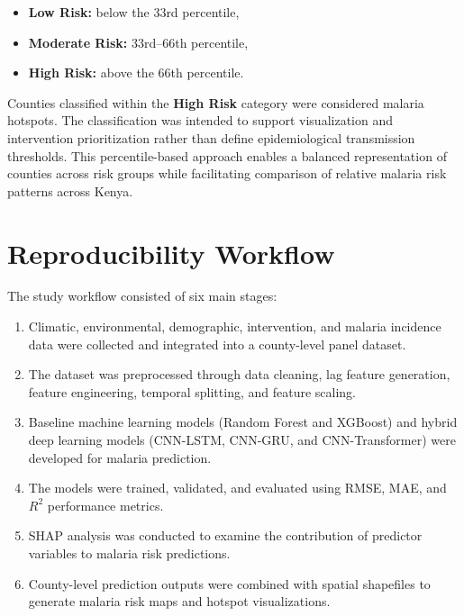 \begin{itemize}
	\item \textbf{Low Risk:} below the 33rd percentile,
	\item \textbf{Moderate Risk:} 33rd--66th percentile,
	\item \textbf{High Risk:} above the 66th percentile.
\end{itemize}

Counties classified within the \textbf{High Risk} category were considered malaria hotspots. The classification was intended to support visualization and intervention prioritization rather than define epidemiological transmission thresholds. This percentile-based approach enables a balanced representation of counties across risk groups while facilitating comparison of relative malaria risk patterns across Kenya.
\section{Reproducibility Workflow}

The study workflow consisted of six main stages:

\begin{enumerate}
	\item Climatic, environmental, demographic, intervention, and malaria incidence data were collected and integrated into a county-level panel dataset.
	
	\item The dataset was preprocessed through data cleaning, lag feature generation, feature engineering, temporal splitting, and feature scaling.
	
	\item Baseline machine learning models (Random Forest and XGBoost) and hybrid deep learning models (CNN-LSTM, CNN-GRU, and CNN-Transformer) were developed for malaria prediction.
	
	\item The models were trained, validated, and evaluated using RMSE, MAE, and $R^2$ performance metrics.
	
	\item SHAP analysis was conducted to examine the contribution of predictor variables to malaria risk predictions.
	
	\item County-level prediction outputs were combined with spatial shapefiles to generate malaria risk maps and hotspot visualizations.
\end{enumerate}

